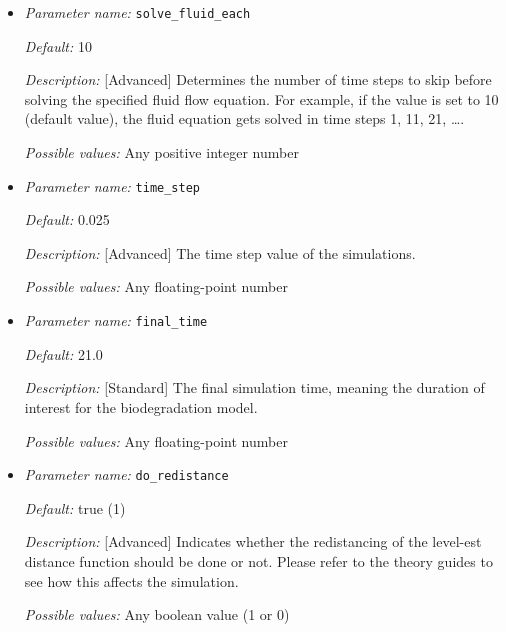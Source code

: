 \begin{itemize}
{\it Possible values:} Any boolean value (1 or 0)


\item {\it Parameter name:} {\tt solve\_fluid\_each}
\label{parameters:solve_fluid_each}


{\it Default:} 10

{\it Description:} [Advanced] Determines the number of time steps to skip before solving the specified fluid flow equation. For example, if the value is set to 10 (default value), the fluid equation gets solved in time steps 1, 11, 21, \ldots.

{\it Possible values:} Any positive integer number


\item {\it Parameter name:} {\tt time\_step}
\label{parameters:time_step}


{\it Default:} 0.025

{\it Description:} [Advanced] The time step value of the simulations.

{\it Possible values:} Any floating-point number


\item {\it Parameter name:} {\tt final\_time}
\label{parameters:final_time}


{\it Default:} 21.0

{\it Description:} [Standard] The final simulation time, meaning the duration of interest for the biodegradation model.

{\it Possible values:} Any floating-point number


\item {\it Parameter name:} {\tt do\_redistance}
\label{parameters:do_redistance}


{\it Default:} true (1)

{\it Description:} [Advanced] Indicates whether the redistancing of the level-est distance function should be done or not. Please refer to the theory guides to see how this affects the simulation.

{\it Possible values:} Any boolean value (1 or 0)



\end{itemize}
